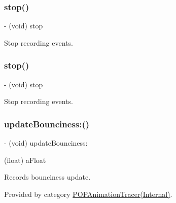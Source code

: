 \subsubsection{\texorpdfstring{stop()}{stop()}\hspace{0.1cm}{\footnotesize\ttfamily [2/3]}}
{\footnotesize\ttfamily -\/ (void) stop \begin{DoxyParamCaption}{ }\end{DoxyParamCaption}}

Stop recording events. \mbox{\label{interface_p_o_p_animation_tracer_aed3b4e3f6cf7ed35047daf44351db7a0}} 
\subsubsection{\texorpdfstring{stop()}{stop()}\hspace{0.1cm}{\footnotesize\ttfamily [3/3]}}
{\footnotesize\ttfamily -\/ (void) stop \begin{DoxyParamCaption}{ }\end{DoxyParamCaption}}

Stop recording events. \mbox{\label{interface_p_o_p_animation_tracer_a61998b16b4eb5df6d11dbd0bd269339c}} 
\subsubsection{\texorpdfstring{update\+Bounciness\+:()}{updateBounciness:()}\hspace{0.1cm}{\footnotesize\ttfamily [1/2]}}
{\footnotesize\ttfamily -\/ (void) update\+Bounciness\+: \begin{DoxyParamCaption}\item[{(float)}]{a\+Float }\end{DoxyParamCaption}}

Records bounciness update. 

Provided by category \mbox{\hyperlink{category_p_o_p_animation_tracer_07_internal_08_a61998b16b4eb5df6d11dbd0bd269339c}{P\+O\+P\+Animation\+Tracer(\+Internal)}}.

